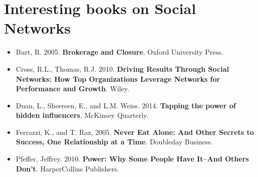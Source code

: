 \documentclass[a4paper,12pt]{article}
\begin{document}
\newpage


\section*{Interesting books on Social Networks}


\begin{itemize}
\item[] Burt, R. 2005. \textbf{Brokerage and Closure}. Oxford University Press.
\item[] Cross, R.L., Thomas, R.J. 2010. \textbf{Driving Results Through Social Networks: How Top Organizations Leverage Networks for Performance and Growth}. Wiley.
\item[] Duan, L., Sheereen, E., and L.M. Weiss. 2014. \textbf{Tapping the power of hidden influencers}. McKinsey Quarterly.
\item[] Ferrazzi, K., and T. Raz, 2005. \textbf{Never Eat Alone: And Other Secrets to Success, One Relationship at a Time}. Doubleday Business.
\item[] Pfeffer, Jeffrey. 2010. \textbf{Power: Why Some People Have It--And Others Don't}. HarperCollins Publishers.
\end{itemize}
\end{document}
